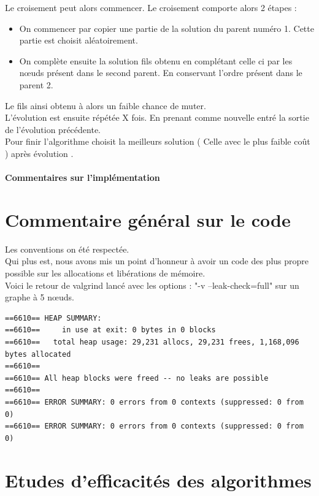 \documentclass[10pt,a4paper]{report}
\begin{document}
		Le croisement peut alors commencer. Le croisement comporte alors 2 étapes :
		\begin{itemize}
			\item On commencer par copier une partie de la solution du parent numéro 1. Cette partie est choisit aléatoirement.
			\item On complète ensuite la solution fils obtenu en complétant celle ci par les nœuds présent dans le second parent. En conservant l'ordre présent dans le parent 2.
		\end{itemize}
		Le fils ainsi obtenu à alors un faible chance de muter. \\
		
		L'évolution est ensuite répétée X fois. En prenant comme nouvelle entré la sortie de l'évolution précédente. \\
		Pour finir l'algorithme choisit la meilleurs solution ( Celle avec le plus faible coût ) après évolution . \\
		
		\paragraph{Commentaires sur l'implémentation}

\newpage		
\section{Commentaire général sur le code}

Les conventions on été respectée. \\
Qui plus est, nous avons mis un point d'honneur à avoir un code des plus propre possible sur les allocations et libérations de mémoire. \\

Voici le retour de valgrind lancé avec les options : "-v --leak-check=full" sur un graphe à 5 nœuds. \\
\begin{verbatim}
==6610== HEAP SUMMARY:
==6610==     in use at exit: 0 bytes in 0 blocks
==6610==   total heap usage: 29,231 allocs, 29,231 frees, 1,168,096 bytes allocated
==6610== 
==6610== All heap blocks were freed -- no leaks are possible
==6610== 
==6610== ERROR SUMMARY: 0 errors from 0 contexts (suppressed: 0 from 0)
==6610== ERROR SUMMARY: 0 errors from 0 contexts (suppressed: 0 from 0)
\end{verbatim}

\newpage
\section{Etudes d'efficacités des algorithmes}
\end{document}
